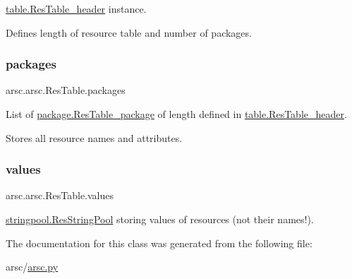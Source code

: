 \mbox{\hyperlink{classarsc_1_1table_1_1ResTable__header}{table.\+Res\+Table\+\_\+header}} instance. 

Defines length of resource table and number of packages. \mbox{\label{classarsc_1_1arsc_1_1ResTable_aac70a39feb4e7ead6bfce81cb4057a9d}} 
\subsubsection{\texorpdfstring{packages}{packages}}
{\footnotesize\ttfamily arsc.\+arsc.\+Res\+Table.\+packages}



List of \mbox{\hyperlink{classarsc_1_1package_1_1ResTable__package}{package.\+Res\+Table\+\_\+package}} of length defined in \mbox{\hyperlink{classarsc_1_1table_1_1ResTable__header}{table.\+Res\+Table\+\_\+header}}. 

Stores all resource names and attributes. \mbox{\label{classarsc_1_1arsc_1_1ResTable_aacbd5386807f5b39a7492bd182eb2319}} 
\subsubsection{\texorpdfstring{values}{values}}
{\footnotesize\ttfamily arsc.\+arsc.\+Res\+Table.\+values}



\mbox{\hyperlink{classarsc_1_1stringpool_1_1ResStringPool}{stringpool.\+Res\+String\+Pool}} storing values of resources (not their names!). 



The documentation for this class was generated from the following file\+:\begin{DoxyCompactItemize}
\item 
arsc/\mbox{\hyperlink{arsc_8py}{arsc.\+py}}\end{DoxyCompactItemize}
